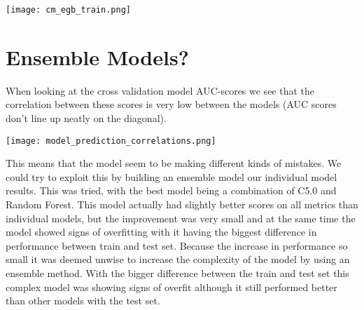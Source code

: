 \documentclass[12pt,a4paper,leqno]{report}
\theoremstyle{plain}
\theoremstyle{definition}
\theoremstyle{remark}
\begin{document}
\bigskip
{
    \centering
    \texttt{[image: cm\_egb\_train.png]}
    \par
}
\bigskip

\section{Ensemble Models?}

When looking at the cross validation model AUC-scores we see that the
correlation between these scores is very low between the models
(AUC scores don't line up neatly on the diagonal).

\bigskip
{
    \centering
    \texttt{[image: model\_prediction\_correlations.png]}
    \par
}
\bigskip

This means that the model seem to be making different kinds of mistakes.
We could try to exploit this by building an ensemble model our individual model results.
This was tried, with the best model being a combination of C5.0 and
Random Forest. This model actually had slightly better scores on all metrics
than individual models, but the improvement was very small and at the same
time the model showed signs of overfitting with it having the biggest difference
in performance between train and test set. Because the increase in performance so small
it was deemed unwise to increase the complexity of the model by using an ensemble method.
With the bigger difference between the train and test set this complex model was showing
signs of overfit although it still performed better than other models with the test set.
\end{document}
